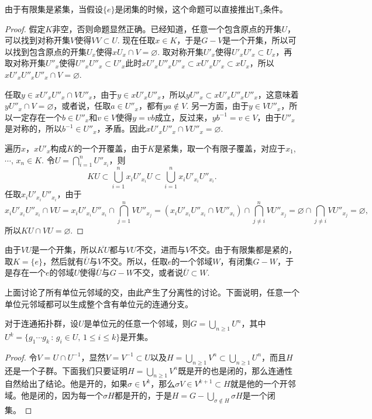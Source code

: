 由于有限集是紧集，当假设$\{e\}$是闭集的时候，这个命题可以直接推出$\mathsf{T}_3$条件。

\begin{proof}
	假定$K$非空，否则命题显然正确。已经知道，任意一个包含原点的开集$U$，可以找到对称开集$V$使得$VV\subset U$. 现在任取$x\in K$，于是$G-V$是一个开集，所以可以找到包含原点的开集$U_x$使得$xU_x\cap V=\varnothing$. 取对称开集$U'_x$使得$U'_xU'_x\subset U_x$，再取对称开集$U''_x$使得$U''_xU''_x\subset U'_x$此时$xU'_xU''_xU''_x\subset xU'_xU'_x\subset xU_x$，所以$xU'_xU''_xU''_x\cap V=\varnothing$. 

	任取$y\in xU'_xU''_x\cap VU''_x$，由于$y\in xU'_xU''_x$，所以$yU''_x\subset xU'_xU''_xU''_x$，这意味着$yU''_x\cap V=\varnothing$，或者说，任取$a\in U''_x$，都有$ya\not\in V$. 另一方面，由于$y\in VU''_x$，所以一定存在一个$b\in U''_x$和$v\in V$使得$y=vb$成立，反过来，$yb^{-1}=v\in V$，由于$U''_x$是对称的，所以$b^{-1}\in U''_x$，矛盾。因此$xU'_xU''_x\cap VU''_x=\varnothing$.

	遍历$x$，$xU'_x$构成$K$的一个开覆盖，由于$K$是紧集，取一个有限子覆盖，对应于$x_1$, $\cdots$, $x_n\in K$. 令$U=\bigcap_{i=1}^n U''_{x_i}$，则
	\[
	KU\subset \bigcup_{i=1}^n {x_i}U'_{x_i}U\subset \bigcup_{i=1}^n x_iU'_{x_i}U''_{x_i}.
	\]
	任取$x_iU'_{x_i}U''_{x_i}$，由于
	\[
		x_iU'_{x_i}U''_{x_i}\cap VU=x_iU'_{x_i}U''_{x_i}\cap \bigcap_{j=1}^n VU''_{x_j}=(x_iU'_{x_i}U''_{x_i}\cap VU''_{x_i})\cap \bigcap_{j\neq i}^n VU''_{x_j}=\varnothing \cap \bigcap_{j\neq i} VU''_{x_j}=\varnothing,
	\]
	所以$KU\cap VU=\varnothing$.
\end{proof}

由于$VU$是一个开集，所以$\overline{KU}$都与$VU$不交，进而与$V$不交。由于有限集都是紧的，取$K=\{e\}$，然后就有$\overline{U}$与$V$不交。所以，任取$e$的一个邻域$W$，有闭集$G-W$，于是存在一个$e$的邻域$U$使得$\overline{U}$与$G-W$不交，或者说$\overline{U}\subset W$.

上面讨论了所有单位元邻域的交，由此产生了分离性的讨论。下面说明，任意一个单位元邻域都可以生成整个含有单位元的连通分支。

\begin{lem}\label{lem:116}
对于连通拓扑群，设$U$是单位元的任意一个邻域，则$G=\bigcup_{n\geq 1}U^n$，其中$U^k=\{g_1\cdots g_k\,:\,g_i\in U,\, 1\leq i \leq k\}$是开集。
\end{lem}

\begin{proof}
令$V=U\cap U^{-1}$，显然$V=V^{-1}\subset U$以及$H=\bigcup_{n\geq 1}V^n\subset \bigcup_{n\geq 1}U^n$，而且$H$还是一个子群。下面我们只要证明$H=\bigcup_{n\geq 1}V^n$既是开的也是闭的，那么连通性自然给出了结论。他是开的，如果$\sigma\in V^k$，那么$\sigma V\in V^{k+1}\subset H$就是他的一个开邻域。他是闭的，因为每一个$\sigma H$都是开的，于是$H=G-\bigcup_{\sigma\notin H}\sigma H$是一个闭集。
\end{proof}

